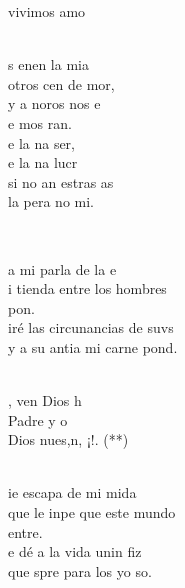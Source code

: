 \documentclass[12pt]{article}
\begin{document}
\begin{multicols*}{2}
\begin{cancion}
	vivimos  amo\\\jump\\
	\begin{chorus}%
	s enen la mia\\
	otros cen de mor,\\
	y a noros  nos e\\
	e mos ran.\\
	e la na ser,\\
	e la na lucr\\
	si no an estras as\\
	la pera no mi.\\
	\end{chorus}%
	\jump\\
\end{cancion}%

\begin{cancion}%
	 a mi parla de la e \\
	i tienda entre los hombres\\
	 pon. \\
	iré las circunancias de suvs\\
	y a su antia mi carne pond.\\\jump\\
	\begin{chorus}%
	, ven Dios h \\
	Padre y o\\
	Dios nues,n, ¡!. (**) \\
	\end{chorus}%
	\jump\\
	ie escapa de mi mida \\
	que le inpe que este mundo\\
	 entre. \\
	e dé a la vida unin fiz\\
	que spre para los yo so. \\
\end{cancion}%


\end{multicols*}
\end{document}
